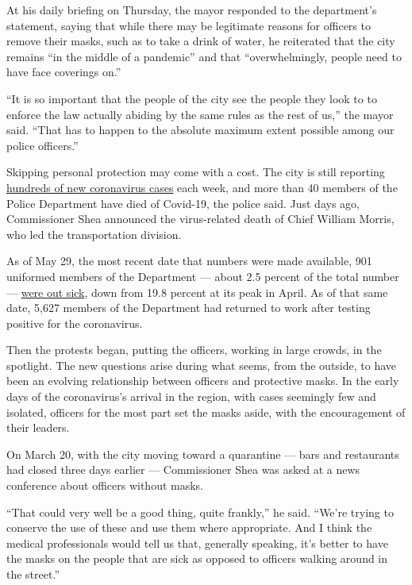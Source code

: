 At his daily briefing on Thursday, the mayor responded to the
department's statement, saying that while there may be legitimate
reasons for officers to remove their masks, such as to take a drink of
water, he reiterated that the city remains ``in the middle of a
pandemic'' and that ``overwhelmingly, people need to have face coverings
on.''

``It is so important that the people of the city see the people they
look to to enforce the law actually abiding by the same rules as the
rest of us,'' the mayor said. ``That has to happen to the absolute
maximum extent possible among our police officers.''

Skipping personal protection may come with a cost. The city is still
reporting
\href{https://www1.nyc.gov/site/doh/covid/covid-19-data.page}{hundreds
of new coronavirus cases} each week, and more than 40 members of the
Police Department have died of Covid-19, the police said. Just days ago,
Commissioner Shea announced the virus-related death of Chief William
Morris, who led the transportation division.

As of May 29, the most recent date that numbers were made available, 901
uniformed members of the Department --- about 2.5 percent of the total
number ---
\href{https://www.nytimes3xbfgragh.onion/2020/04/03/nyregion/coronavirus-nypd.html}{were
out sick}, down from 19.8 percent at its peak in April. As of that same
date, 5,627 members of the Department had returned to work after testing
positive for the coronavirus.

Then the protests began, putting the officers, working in large crowds,
in the spotlight. The new questions arise during what seems, from the
outside, to have been an evolving relationship between officers and
protective masks. In the early days of the coronavirus's arrival in the
region, with cases seemingly few and isolated, officers for the most
part set the masks aside, with the encouragement of their leaders.

On March 20, with the city moving toward a quarantine --- bars and
restaurants had closed three days earlier --- Commissioner Shea was
asked at a news conference about officers without masks.

``That could very well be a good thing, quite frankly,'' he said.
``We're trying to conserve the use of these and use them where
appropriate. And I think the medical professionals would tell us that,
generally speaking, it's better to have the masks on the people that are
sick as opposed to officers walking around in the street.''

